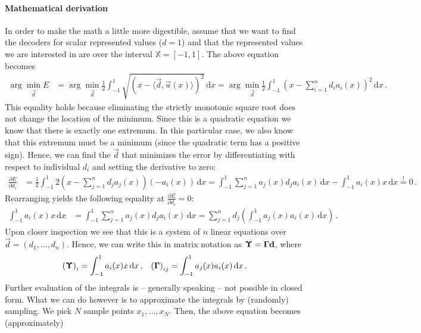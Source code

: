 \documentclass[10pt,letterpaper,oneside]{article}
\begin{document}
\paragraph{Mathematical derivation} In order to make the math a little more digestible, assume that we want to find the decoders for scalar represented values ($d = 1$) and that the represented values we are interested in are over the interval $\mathbb{X} = [-1, 1]$. The above equation becomes
\begin{align}
	\arg\min_{\vec d} E
		&= \arg\min_{\vec d} \frac{1}{2} \int_{-1}^1 \sqrt{ \left(x - \langle \vec d, \vec a(x) \rangle\right)^2 } \,\mathrm{d}x
		 = \arg\min_{\vec d} \frac{1}{2} \int_{-1}^1 \left(x - \sum_{i = 1}^n d_i a_i(x) \right)^2 \,\mathrm{d}x \,.
	\label{eqn:decoder_loss}
\end{align}
This equality holds because eliminating the strictly monotonic square root does not change the location of the minimum. Since this is a quadratic equation we know that there is exactly one extremum. In this particular case, we also know that this extremum must be a minimum (since the quadratic term has a positive sign). Hence, we can find the $\vec d$ that minimizes the error by differentiating with respect to individual $d_i$ and setting the derivative to zero:
\begin{align*}
	\frac{\partial E}{\partial d_i}
		&= \frac{1}2 \int_{-1}^1 2 \left(x - \sum_{j = 1}^n d_j a_j(x) \right) \left(-a_i(x) \right) \,\mathrm{d}x
		 = \int_{-1}^1 \sum_{j = 1}^n a_j(x) d_j a_i(x) \,\mathrm{d}x - \int_{-1}^1 a_i(x) x \,\mathrm{d}x
		\overset{!}= 0 \,.
\end{align*}
Rearranging yields the following equality at $\frac{\partial E}{\partial d_i} = 0$:
\begin{align*}
	\int_{-1}^1 a_i(x) x \,\mathrm{d}x
		&= \int_{-1}^1 \sum_{j = 1}^n a_j(x) d_j a_i(x) \,\mathrm{d}x
		 = \sum_{j = 1}^n d_j \left( \int_{-1}^1 a_j(x) a_i(x) \,\mathrm{d}x \right) \,.
\end{align*}
Upon closer inspection we see that this is a system of $n$ linear equations over $\vec d = (d_1, \ldots, d_n)$. Hence, we can write this in matrix notation as ${\mathbf{\Upsilon}} = {\mathbf{\Gamma}} {\mathbf{d}}$, where
\begin{align*}
	\left( {\mathbf{\Upsilon}} \right)_i
		&= \int_{-1}^1 a_i(x) x \,\mathrm{d}x \,, &
	\left( {\mathbf{\Gamma}} \right)_{ij}
		 = \int_{-1}^1 a_j(x) a_i(x) \,\mathrm{d}x \,.
\end{align*}
Further evaluation of the integrals is -- generally speaking -- not possible in closed form. What we can do however is to approximate the integrals by (randomly) sampling. We pick $N$ sample points $x_1, \ldots, x_N$. Then, the above equation becomes (approximately)
\end{document}
